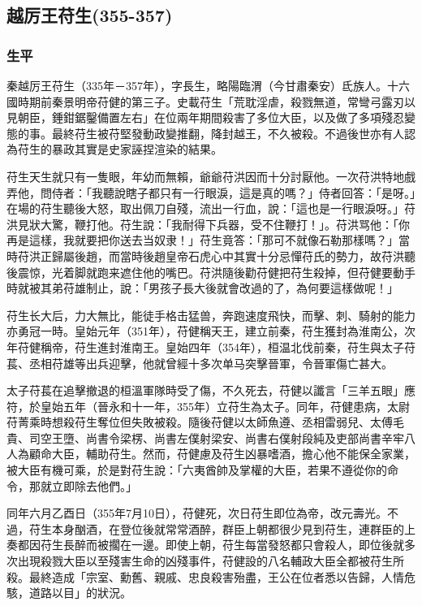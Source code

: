 
\subsection{越厉王苻生\tiny(355-357)}

\subsubsection{生平}

秦越厉王苻生（335年－357年），字長生，略陽臨渭（今甘肅秦安）氐族人。十六國時期前秦景明帝苻健的第三子。史載苻生「荒耽淫虐，殺戮無道，常彎弓露刃以見朝臣，錘鉗鋸鑿備置左右」在位兩年期間殺害了多位大臣，以及做了多項殘忍變態的事。最終苻生被苻堅發動政變推翻，降封越王，不久被殺。不過後世亦有人認為苻生的暴政其實是史家誣捏渲染的結果。

苻生天生就只有一隻眼，年幼而無賴，爺爺苻洪因而十分討厭他。一次苻洪特地戲弄他，問侍者：「我聽說瞎子都只有一行眼淚，這是真的嗎？」侍者回答：「是呀。」在場的苻生聽後大怒，取出佩刀自殘，流出一行血，說：「這也是一行眼淚呀。」苻洪見狀大驚，鞭打他。苻生說：「我耐得下兵器，受不住鞭打！」。苻洪骂他：「你再是這樣，我就要把你送去当奴隶！」苻生竟答：「那可不就像石勒那樣嗎？」當時苻洪正歸屬後趙，而當時後趙皇帝石虎心中其實十分忌憚苻氏的勢力，故苻洪聽後震惊，光着脚就跑来遮住他的嘴巴。苻洪隨後勸苻健把苻生殺掉，但苻健要動手時就被其弟苻雄制止，說：「男孩子長大後就會改過的了，為何要這樣做呢！」

苻生长大后，力大無比，能徒手格击猛兽，奔跑速度飛快，而擊、刺、騎射的能力亦勇冠一時。皇始元年（351年），苻健稱天王，建立前秦，苻生獲封為淮南公，次年苻健稱帝，苻生進封淮南王。皇始四年（354年），桓温北伐前秦，苻生與太子苻萇、丞相苻雄等出兵迎擊，他就曾經十多次单马突擊晉軍，令晉軍傷亡甚大。

太子苻萇在追擊撤退的桓溫軍隊時受了傷，不久死去，苻健以讖言「三羊五眼」應符，於皇始五年（晉永和十一年，355年）立苻生為太子。同年，苻健患病，太尉苻菁乘時想殺苻生奪位但失敗被殺。隨後苻健以太師魚遵、丞相雷弱兒、太傅毛貴、司空王墮、尚書令梁楞、尚書左僕射梁安、尚書右僕射段純及吏部尚書辛牢八人為顧命大臣，輔助苻生。然而，苻健慮及苻生凶暴嗜酒，擔心他不能保全家業，被大臣有機可乘，於是對苻生說：「六夷酋帥及掌權的大臣，若果不遵從你的命令，那就立即除去他們。」

同年六月乙酉日（355年7月10日），苻健死，次日苻生即位為帝，改元壽光。不過，苻生本身酗酒，在登位後就常常酒醉，群臣上朝都很少見到苻生，連群臣的上奏都因苻生長醉而被擱在一邊。即使上朝，苻生每當發怒都只會殺人，即位後就多次出現殺戮大臣以至殘害生命的凶殘事件，苻健設的八名輔政大臣全都被苻生所殺。最終造成「宗室、勳舊、親戚、忠良殺害殆盡，王公在位者悉以告歸，人情危駭，道路以目」的狀況。

